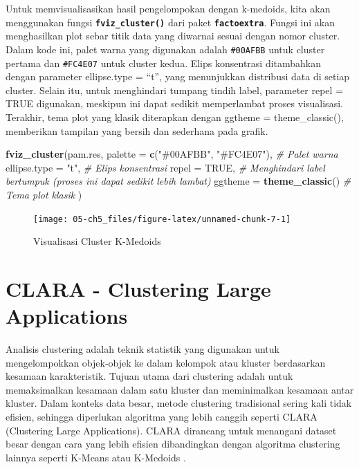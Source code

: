 \documentclass[
  oneside]{book}
\newenvironment{Shaded}{\begin{snugshade}}{\end{snugshade}}
\newcommand{\AttributeTok}[1]{\textcolor[rgb]{0.13,0.29,0.53}{#1}}
\newcommand{\CommentTok}[1]{\textcolor[rgb]{0.56,0.35,0.01}{\textit{#1}}}
\newcommand{\ConstantTok}[1]{\textcolor[rgb]{0.56,0.35,0.01}{#1}}
\newcommand{\FunctionTok}[1]{\textcolor[rgb]{0.13,0.29,0.53}{\textbf{#1}}}
\newcommand{\NormalTok}[1]{#1}
\newcommand{\StringTok}[1]{\textcolor[rgb]{0.31,0.60,0.02}{#1}}
\begin{document}
Untuk memvisualisasikan hasil pengelompokan dengan k-medoids, kita akan menggunakan fungsi \textbf{\texttt{fviz\_cluster()}} dari paket \textbf{\texttt{factoextra}}. Fungsi ini akan menghasilkan plot sebar titik data yang diwarnai sesuai dengan nomor cluster. Dalam kode ini, palet warna yang digunakan adalah \texttt{\#00AFBB} untuk cluster pertama dan \texttt{\#FC4E07} untuk cluster kedua. Elips konsentrasi ditambahkan dengan parameter ellipse.type = ``t'', yang menunjukkan distribusi data di setiap cluster. Selain itu, untuk menghindari tumpang tindih label, parameter repel = TRUE digunakan, meskipun ini dapat sedikit memperlambat proses visualisasi. Terakhir, tema plot yang klasik diterapkan dengan ggtheme = theme\_classic(), memberikan tampilan yang bersih dan sederhana pada grafik.

\begin{Shaded}
\begin{Highlighting}[]
\FunctionTok{fviz\_cluster}\NormalTok{(pam.res,}
  \AttributeTok{palette =} \FunctionTok{c}\NormalTok{(}\StringTok{"\#00AFBB"}\NormalTok{, }\StringTok{"\#FC4E07"}\NormalTok{), }\CommentTok{\# Palet warna}
  \AttributeTok{ellipse.type =} \StringTok{"t"}\NormalTok{, }\CommentTok{\# Elips konsentrasi}
  \AttributeTok{repel =} \ConstantTok{TRUE}\NormalTok{, }\CommentTok{\# Menghindari label bertumpuk (proses ini dapat sedikit lebih lambat)}
  \AttributeTok{ggtheme =} \FunctionTok{theme\_classic}\NormalTok{() }\CommentTok{\# Tema plot klasik}
\NormalTok{)}
\end{Highlighting}
\end{Shaded}

\begin{figure}[h]

{\centering \texttt{[image: 05-ch5\_files/figure-latex/unnamed-chunk-7-1]} 

}

\caption{Visualisasi Cluster K-Medoids}\label{fig:unnamed-chunk-7}
\end{figure}

\chapter{CLARA - Clustering Large Applications}\label{clra}

Analisis clustering adalah teknik statistik yang digunakan untuk
mengelompokkan objek-objek ke dalam kelompok atau kluster berdasarkan
kesamaan karakteristik. Tujuan utama dari clustering adalah untuk
memaksimalkan kesamaan dalam satu kluster dan meminimalkan kesamaan
antar kluster. Dalam konteks data besar, metode clustering tradisional
sering kali tidak efisien, sehingga diperlukan algoritma yang lebih
canggih seperti CLARA (Clustering Large Applications). CLARA dirancang
untuk menangani dataset besar dengan cara yang lebih efisien
dibandingkan dengan algoritma clustering lainnya seperti K-Means atau
K-Medoids \citep{kaufman1990finding}.
\end{document}
